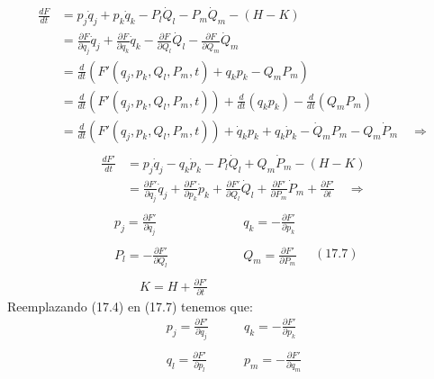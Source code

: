 \documentclass[a4paper]{article}
\begin{document}
\begin{answer}[Punto 3]
        \begin{align*}
            \frac{dF}{dt}  &=p_j \dot q_j + p_k \dot q_k - P_l\dot Q_l- P_m \dot Q_m - (H - K)\\
            &= \frac{\partial F}{\partial q_j} \dot q_j + \frac{\partial F}{\partial q_k} \dot q_k - \frac{\partial F}{\partial Q_l}\dot Q_l- \frac{\partial F}{\partial Q_m} \dot Q_m\\
            &= \frac d{dt}\left(F'(q_j, p_k, Q_l, P_m, t) + q_k p_k - Q_m P_m \right)\\
            &= \frac d{dt}\left(F'(q_j, p_k, Q_l, P_m, t) \right) + \frac d{dt}\left(q_k p_k \right) - \frac d{dt}\left(Q_m P_m \right)\\
            &= \frac d{dt}\left(F'(q_j, p_k, Q_l, P_m, t) \right) + \dot q_k p_k + q_k \dot p_k - \dot Q_m P_m - Q_m \dot P_m \quad \Rightarrow\\
        \end{align*}
        \begin{align*}
            \frac {dF'}{dt} &= p_j\dot q_j - q_k \dot p_k - P_l\dot Q_l + Q_m \dot P_m - (H-K)\\
            &= \frac{\partial F'}{\partial q_j} \dot q_j + \frac{\partial F'}{\partial p_k} \dot p_k + \frac{\partial F'}{\partial Q_l}\dot Q_l+\frac{\partial F'}{\partial P_m} \dot P_m + \frac{\partial F'}{\partial t} \quad \Rightarrow\\
        \end{align*}
        \begin{equation*}
            \begin{align*}
                p_j = \frac{\partial F'}{\partial q_j} & \qquad q_k = -\frac{\partial F'}{\partial p_k} \\\\
                P_l = -\frac{\partial F'}{\partial Q_l} & \qquad Q_m = \frac{\partial F'}{\partial P_m} \\\\
                \qquad K = H+\frac{\partial F'}{\partial t} 
            \end{align*} \quad (17.7)    
        \end{equation*}
        Reemplazando (17.4) en (17.7) tenemos que:
        \begin{align*}
            p_j = \frac{\partial F'}{\partial q_j} & \qquad q_k = -\frac{\partial F'}{\partial p_k} \\\\
            q_l = \frac{\partial F'}{\partial p_l} & \qquad p_m = -\frac{\partial F'}{\partial q_m} \\\\

\end{align*}
\end{answer}
\end{document}
